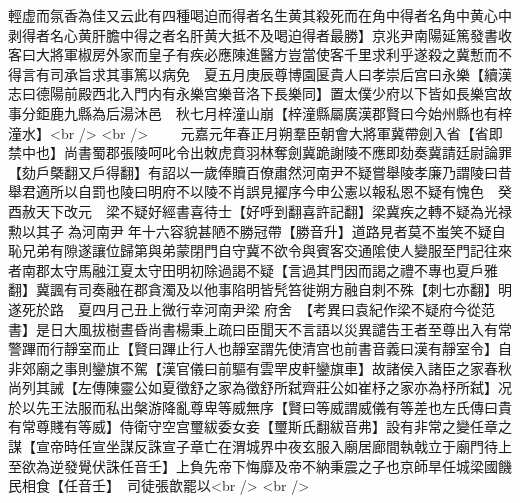輕虚而氛香為佳又云此有四種喝迫而得者名生黄其殺死而在角中得者名角中黄心中剥得者名心黄肝膽中得之者名肝黄大抵不及喝迫得者最勝】京兆尹南陽延篤發書收客曰大將軍椒房外家而皇子有疾必應陳進醫方豈當使客千里求利乎遂殺之冀慙而不得言有司承旨求其事篤以病免　夏五月庚辰尊博園匽貴人曰孝崇后宫曰永樂【續漢志曰德陽前殿西北入門内有永樂宫樂音洛下長樂同】置太僕少府以下皆如長樂宫故事分鉅鹿九縣為后湯沐邑　秋七月梓潼山崩【梓潼縣屬廣漢郡賢曰今始州縣也有梓潼水】<br />
<br />
　　元嘉元年春正月朔羣臣朝會大將軍冀帶劍入省【省即禁中也】尚書蜀郡張陵呵叱令出敇虎賁羽林奪劍冀跪謝陵不應即劾奏冀請廷尉論罪【劾戶槩翻又戶得翻】有詔以一歲俸贖百僚肅然河南尹不疑嘗舉陵孝廉乃謂陵曰昔舉君適所以自罰也陵曰明府不以陵不肖誤見擢序今申公憲以報私恩不疑有愧色　癸酉赦天下改元　梁不疑好經書喜待士【好呼到翻喜許記翻】梁冀疾之轉不疑為光禄勲以其子為河南尹年十六容貌甚陋不勝冠帶【勝音升】道路見者莫不蚩笑不疑自恥兄弟有隙遂讓位歸第與弟蒙閉門自守冀不欲令與賓客交通隂使人變服至門記往來者南郡太守馬融江夏太守田明初除過謁不疑【言過其門因而謁之禮不專也夏戶雅翻】冀諷有司奏融在郡貪濁及以他事陷明皆髠笞徙朔方融自刺不殊【刺七亦翻】明遂死於路　夏四月己丑上微行幸河南尹梁府舍　【考異曰袁紀作梁不疑府今從范書】是日大風拔樹晝昏尚書楊秉上疏曰臣聞天不言語以災異譴告王者至尊出入有常警蹕而行靜室而止【賢曰蹕止行人也靜室謂先使清宫也前書音義曰漢有靜室令】自非郊廟之事則鑾旗不駕【漢官儀曰前驅有雲䍐皮軒鑾旗車】故諸侯入諸臣之家春秋尚列其誡【左傳陳靈公如夏徵舒之家為徵舒所弑齊莊公如崔杼之家亦為杼所弑】况於以先王法服而私出槃游降亂尊卑等威無序【賢曰等威謂威儀有等差也左氏傳曰貴有常尊賤有等威】侍衛守空宫璽紱委女妾【璽斯氏翻紱音弗】設有非常之變任章之謀【宣帝時任宣坐謀反誅宣子章亡在渭城界中夜玄服入廟居廊間執戟立于廟門待上至欲為逆發覺伏誅任音壬】上負先帝下悔靡及帝不納秉震之子也京師旱任城梁國饑民相食【任音壬】　司徒張歆罷以<br />
<br />
